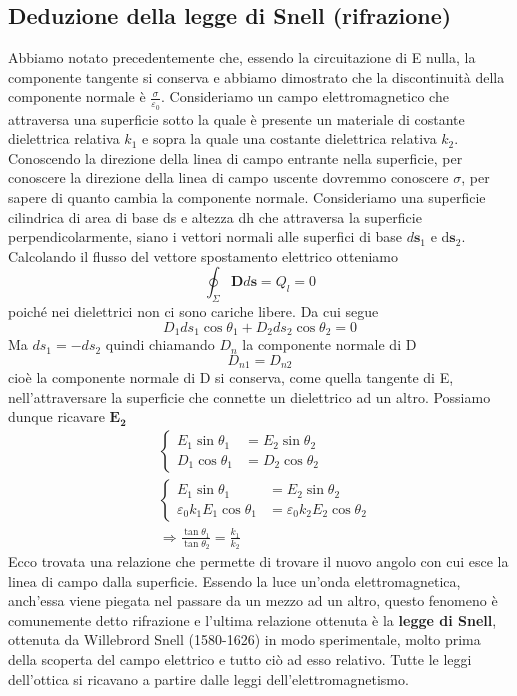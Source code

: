 \documentclass[
10pt, %
a4paper, %
oneside, %
headinclude,footinclude, %
BCOR5mm, %
]{scrartcl}
\begin{document}
\subsection{Deduzione della legge di Snell (rifrazione)}
Abbiamo notato precedentemente che, essendo la circuitazione di E nulla, la componente tangente si conserva e abbiamo dimostrato che la discontinuità della componente normale è $\frac{\sigma}{\varepsilon_0}$. Consideriamo un campo elettromagnetico che attraversa una superficie sotto la quale è presente un materiale di costante dielettrica relativa \(k_1\) e sopra la quale una costante dielettrica relativa \(k_2\). Conoscendo la direzione della linea di campo entrante nella superficie, per conoscere la direzione della linea di campo uscente dovremmo conoscere $\sigma$, per sapere di quanto cambia la componente normale. Consideriamo una superficie cilindrica di area di base ds e altezza dh che attraversa la superficie perpendicolarmente, siano i vettori normali alle superfici di base \(d\mathbf{s}_1\) e d\(\mathbf{s}_2\). Calcolando il flusso del vettore spostamento elettrico otteniamo
\[\oint_{\Sigma}\mathbf{D}d\mathbf{s} = Q_l = 0\]
poiché nei dielettrici non ci sono cariche libere. Da cui segue
\[D_1ds_1\cos\theta_1 + D_2ds_2\cos\theta_2 = 0\]
Ma \(ds_1 = -ds_2\) quindi chiamando \(D_n\) la componente normale di D
\[D_{n1} = D_{n2}\]
cioè la componente normale di D si conserva, come quella tangente di E, nell'attraversare la superficie che connette un dielettrico ad un altro. Possiamo dunque ricavare $\mathbf{E_2}$
\begin{align*}
	&\begin{cases}
		E_1\sin\theta_1 &= E_2\sin\theta_2 \\
		D_1\cos\theta_1 &= D_2\cos\theta_2 
	\end{cases}
\\
	&\begin{cases}
		E_1\sin\theta_1 &= E_2\sin\theta_2 \\
		\varepsilon_0k_1E_1\cos\theta_1 &= \varepsilon_0k_2E_2\cos\theta_2 
	\end{cases}
\\
	&\Rightarrow \frac{\tan\theta_1}{\tan\theta_2} = \frac{k_1}{k_2}
\end{align*}
Ecco trovata una relazione che permette di trovare il nuovo angolo con cui esce la linea di campo dalla superficie. Essendo la luce un'onda elettromagnetica, anch'essa viene piegata nel passare da un mezzo ad un altro, questo fenomeno è comunemente detto rifrazione e l'ultima relazione ottenuta è la \textbf{legge di Snell}, ottenuta da Willebrord Snell (1580-1626) in modo sperimentale, molto prima della scoperta del campo elettrico e tutto ciò ad esso relativo. Tutte le leggi dell'ottica si ricavano a partire dalle leggi dell'elettromagnetismo. 
\end{document}
